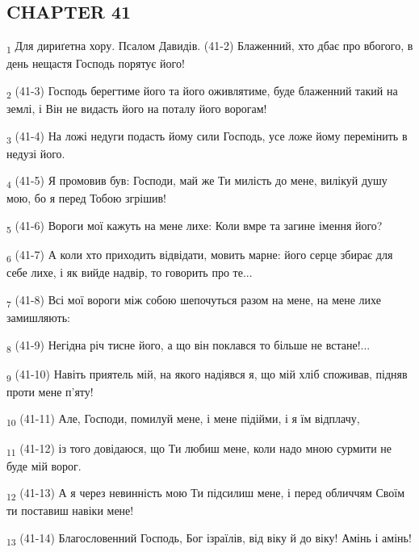 \subsection{CHAPTER 41}
\begin{tcolorbox}
\textsubscript{1} Для дириґетна хору. Псалом Давидів. (41-2) Блаженний, хто дбає про вбогого, в день нещастя Господь порятує його!
\end{tcolorbox}
\begin{tcolorbox}
\textsubscript{2} (41-3) Господь берегтиме його та його оживлятиме, буде блаженний такий на землі, і Він не видасть його на поталу його ворогам!
\end{tcolorbox}
\begin{tcolorbox}
\textsubscript{3} (41-4) На ложі недуги подасть йому сили Господь, усе ложе йому перемінить в недузі його.
\end{tcolorbox}
\begin{tcolorbox}
\textsubscript{4} (41-5) Я промовив був: Господи, май же Ти милість до мене, вилікуй душу мою, бо я перед Тобою згрішив!
\end{tcolorbox}
\begin{tcolorbox}
\textsubscript{5} (41-6) Вороги мої кажуть на мене лихе: Коли вмре та загине імення його?
\end{tcolorbox}
\begin{tcolorbox}
\textsubscript{6} (41-7) А коли хто приходить відвідати, мовить марне: його серце збирає для себе лихе, і як вийде надвір, то говорить про те...
\end{tcolorbox}
\begin{tcolorbox}
\textsubscript{7} (41-8) Всі мої вороги між собою шепочуться разом на мене, на мене лихе замишляють:
\end{tcolorbox}
\begin{tcolorbox}
\textsubscript{8} (41-9) Негідна річ тисне його, а що він поклався то більше не встане!...
\end{tcolorbox}
\begin{tcolorbox}
\textsubscript{9} (41-10) Навіть приятель мій, на якого надіявся я, що мій хліб споживав, підняв проти мене п'яту!
\end{tcolorbox}
\begin{tcolorbox}
\textsubscript{10} (41-11) Але, Господи, помилуй мене, і мене підійми, і я їм відплачу,
\end{tcolorbox}
\begin{tcolorbox}
\textsubscript{11} (41-12) із того довідаюся, що Ти любиш мене, коли надо мною сурмити не буде мій ворог.
\end{tcolorbox}
\begin{tcolorbox}
\textsubscript{12} (41-13) А я через невинність мою Ти підсилиш мене, і перед обличчям Своїм ти поставиш навіки мене!
\end{tcolorbox}
\begin{tcolorbox}
\textsubscript{13} (41-14) Благословенний Господь, Бог ізраїлів, від віку й до віку! Амінь і амінь!
\end{tcolorbox}
